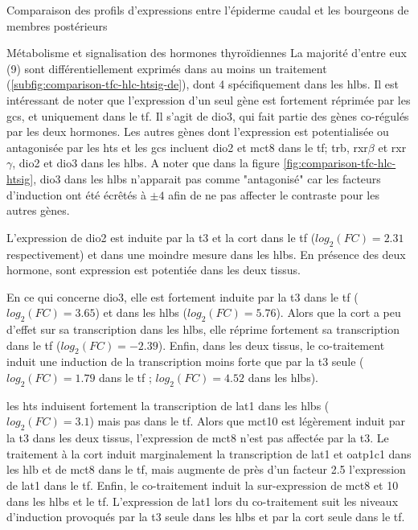 \documentclass[../main.tex]{subfiles}
\begin{document}
\begin{chapter}{Comparaison des profils d'expressions entre l'épiderme caudal et les bourgeons de membres postérieurs}
\begin{section}{Métabolisme et signalisation des hormones thyroïdiennes}
La majorité d'entre eux (9) sont différentiellement exprimés dans au moins un traitement (\autoref{subfig:comparison-tfc-hlc-htsig-de}), dont 4 spécifiquement dans les \glspl{hlb}.
Il est intéressant de noter que l'expression d'un seul gène est fortement réprimée par les \glspl{gc}, et uniquement dans le \gls{tf}.
Il s'agit de \gls{dio3}, qui fait partie des gènes co-régulés par les deux hormones.
Les autres gènes dont l'expression est potentialisée ou antagonisée par les \glspl{ht} et les \glspl{gc} incluent \gls{dio2} et \gls{mct}8 dans le \gls{tf}; \gls{trb}, \gls{rxr}$\beta$ et \gls{rxr}$\gamma$, \gls{dio2} et \gls{dio3} dans les \glspl{hlb}.
A noter que dans la figure \autoref{fig:comparison-tfc-hlc-htsig}, \gls{dio3} dans les \glspl{hlb} n'apparait pas comme "antagonisé" car les facteurs d'induction ont été écrêtés à $\pm 4$ afin de ne pas affecter le contraste pour les autres gènes.
\par
L'expression de \gls{dio2} est induite par la \gls{t3} et la \gls{cort} dans le \gls{tf} ($log_2(FC)=2.31$ respectivement) et dans une moindre mesure dans les \glspl{hlb}.
En présence des deux hormone, sont expression est potentiée dans les deux tissus.
\par
En ce qui concerne \gls{dio3}, elle est fortement induite par la \gls{t3} dans le \gls{tf} ($log_2(FC)=3.65$) et dans les \glspl{hlb} ($log_2(FC)=5.76$).
Alors que la \gls{cort} a peu d'effet sur sa transcription dans les \glspl{hlb}, elle réprime fortement sa transcription dans le \gls{tf} ($log_2(FC)=-2.39$).
Enfin, dans les deux tissus, le co-traitement induit une induction de la transcription moins forte que par la \gls{t3} seule ($log_2(FC)=1.79$ dans le \gls{tf} ; $log_2(FC)=4.52$ dans les \glspl{hlb}).
\par
les \glspl{ht} induisent fortement la transcription de \gls{lat}1 dans les \glspl{hlb} ($log_2(FC)=3.1$) mais pas dans le \gls{tf}.
Alors que \gls{mct}10 est légèrement induit par la \gls{t3} dans les deux tissus, l'expression de \gls{mct}8 n'est pas affectée par la \gls{t3}.
Le traitement à la \gls{cort} induit marginalement la transcription de \gls{lat}1 et \gls{oatp}1c1 dans les \gls{hlb} et de \gls{mct}8 dans le \gls{tf}, mais augmente de près d'un facteur 2.5 l'expression de \gls{lat}1 dans le \gls{tf}.
Enfin, le co-traitement induit la sur-expression de \gls{mct}8 et 10 dans les \glspl{hlb} et le \gls{tf}.
L'expression de \gls{lat}1 lors du co-traitement suit les niveaux d'induction provoqués par la \gls{t3} seule dans les \glspl{hlb} et par la \gls{cort} seule dans le \gls{tf}.

\end{section}

\end{chapter}
\end{document}
